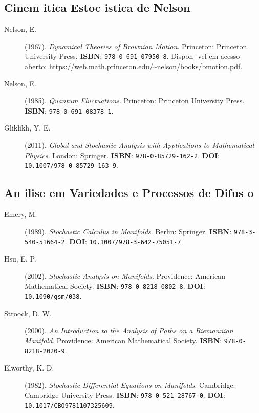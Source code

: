 \subsection{Cinem itica Estoc istica de Nelson}

\begin{description}
\item[Nelson, E.] (1967). \textit{Dynamical Theories of Brownian Motion}. Princeton: Princeton University Press. \textbf{ISBN}: \texttt{978-0-691-07950-8}. Dispon -vel em acesso aberto: \url{https://web.math.princeton.edu/~nelson/books/bmotion.pdf}.

\item[Nelson, E.] (1985). \textit{Quantum Fluctuations}. Princeton: Princeton University Press. \textbf{ISBN}: \texttt{978-0-691-08378-1}.

\item[Gliklikh, Y. E.] (2011). \textit{Global and Stochastic Analysis with Applications to Mathematical Physics}. London: Springer. \textbf{ISBN}: \texttt{978-0-85729-162-2}. \textbf{DOI}: \texttt{10.1007/978-0-85729-163-9}.
\end{description}

\subsection{An ilise em Variedades e Processos de Difus o}

\begin{description}
\item[Emery, M.] (1989). \textit{Stochastic Calculus in Manifolds}. Berlin: Springer. \textbf{ISBN}: \texttt{978-3-540-51664-2}. \textbf{DOI}: \texttt{10.1007/978-3-642-75051-7}.

\item[Hsu, E. P.] (2002). \textit{Stochastic Analysis on Manifolds}. Providence: American Mathematical Society. \textbf{ISBN}: \texttt{978-0-8218-0802-8}. \textbf{DOI}: \texttt{10.1090/gsm/038}.

\item[Stroock, D. W.] (2000). \textit{An Introduction to the Analysis of Paths on a Riemannian Manifold}. Providence: American Mathematical Society. \textbf{ISBN}: \texttt{978-0-8218-2020-9}.

\item[Elworthy, K. D.] (1982). \textit{Stochastic Differential Equations on Manifolds}. Cambridge: Cambridge University Press. \textbf{ISBN}: \texttt{978-0-521-28767-0}. \textbf{DOI}: \texttt{10.1017/CBO9781107325609}.
\end{description}

